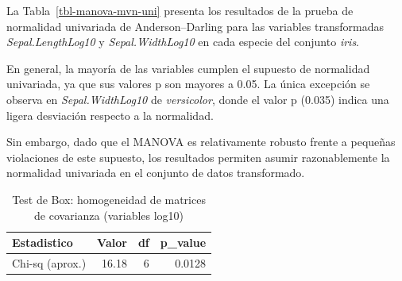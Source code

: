 \documentclass[
  spanish,
  11pt,
  a4paper,
  DIV=11,
  numbers=noendperiod]{scrartcl}
\newenvironment{Shaded}{\begin{snugshade}}{\end{snugshade}}
\newcommand{\AttributeTok}[1]{\textcolor[rgb]{0.40,0.45,0.13}{#1}}
\newcommand{\CommentTok}[1]{\textcolor[rgb]{0.37,0.37,0.37}{#1}}
\newcommand{\DecValTok}[1]{\textcolor[rgb]{0.68,0.00,0.00}{#1}}
\newcommand{\FloatTok}[1]{\textcolor[rgb]{0.68,0.00,0.00}{#1}}
\newcommand{\FunctionTok}[1]{\textcolor[rgb]{0.28,0.35,0.67}{#1}}
\newcommand{\NormalTok}[1]{\textcolor[rgb]{0.00,0.23,0.31}{#1}}
\newcommand{\OtherTok}[1]{\textcolor[rgb]{0.00,0.23,0.31}{#1}}
\newcommand{\SpecialCharTok}[1]{\textcolor[rgb]{0.37,0.37,0.37}{#1}}
\newcommand{\StringTok}[1]{\textcolor[rgb]{0.13,0.47,0.30}{#1}}
\begin{document}
La Tabla~\ref{tbl-manova-mvn-uni} presenta los resultados de la prueba
de normalidad univariada de Anderson--Darling para las variables
transformadas \emph{Sepal.LengthLog10} y \emph{Sepal.WidthLog10} en cada
especie del conjunto \emph{iris}.

En general, la mayoría de las variables cumplen el supuesto de
normalidad univariada, ya que sus valores p son mayores a 0.05. La única
excepción se observa en \emph{Sepal.WidthLog10} de \emph{versicolor},
donde el valor p (0.035) indica una ligera desviación respecto a la
normalidad.

Sin embargo, dado que el MANOVA es relativamente robusto frente a
pequeñas violaciones de este supuesto, los resultados permiten asumir
razonablemente la normalidad univariada en el conjunto de datos
transformado.

\begin{Shaded}
\end{Shaded}

\begin{longtable}[]{@{}lrrr@{}}

\caption{\label{tbl-manova-boxm}Test de Box: homogeneidad de matrices de
covarianza (variables log10)}

\tabularnewline

\toprule\noalign{}
Estadistico & Valor & df & p\_value \\
\midrule\noalign{}
\endhead
\bottomrule\noalign{}
\endlastfoot
Chi-sq (aprox.) & 16.18 & 6 & 0.0128 \\

\end{longtable}
\end{document}
